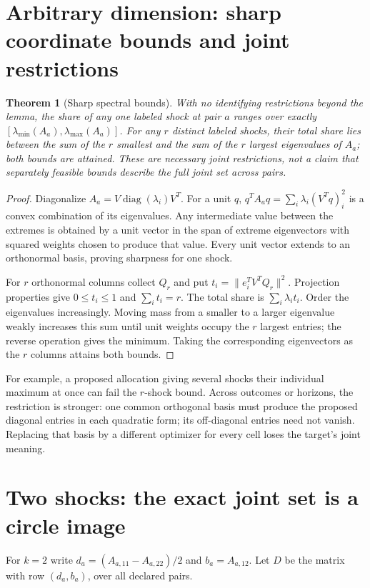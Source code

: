 \documentclass[11pt]{article}
\newtheorem{theorem}{Theorem}
\theoremstyle{remark}
\newcommand{\diag}{\operatorname{diag}}
\begin{document}
\section{Arbitrary dimension: sharp coordinate bounds and joint restrictions}
\begin{theorem}[Sharp spectral bounds]
With no identifying restrictions beyond the lemma, the share of any one
labeled shock at pair $a$ ranges over exactly
$[\lambda_{\min}(A_a),\lambda_{\max}(A_a)]$.
For any $r$ distinct labeled shocks, their total share lies between the
sum of the $r$ smallest and the sum of the $r$ largest eigenvalues of
$A_a$; both bounds are attained. These are necessary joint restrictions,
not a claim that separately feasible bounds describe the full joint set
across pairs.
\end{theorem}
\begin{proof}
Diagonalize $A_a=V\diag(\lambda_i)V^T$. For a unit $q$,
$q^TA_aq=\sum_i\lambda_i(V^Tq)_i^2$ is a convex combination of its
eigenvalues. Any intermediate value between the extremes is obtained by
a unit vector in the span of extreme eigenvectors with squared weights
chosen to produce that value. Every unit vector extends to an orthonormal
basis, proving sharpness for one shock.

For $r$ orthonormal columns collect $Q_r$ and put
$t_i=\|e_i^TV^TQ_r\|^2$. Projection properties give $0\leq t_i\leq1$
and $\sum_i t_i=r$. The total share is $\sum_i\lambda_i t_i$.
Order the eigenvalues increasingly. Moving mass from a smaller to a larger
eigenvalue weakly increases this sum until unit weights occupy the $r$
largest entries; the reverse operation gives the minimum. Taking the
corresponding eigenvectors as the $r$ columns attains both bounds.
\end{proof}
For example, a proposed allocation giving several shocks their individual
maximum at once can fail the $r$-shock bound. Across outcomes or horizons,
the restriction is stronger: one common orthogonal basis must produce the proposed diagonal entries
in each quadratic form; its off-diagonal entries need not vanish. Replacing that basis by a
different optimizer for every cell loses the target's joint meaning.

\section{Two shocks: the exact joint set is a circle image}
For $k=2$ write $d_a=(A_{a,11}-A_{a,22})/2$ and $b_a=A_{a,12}$.
Let $D$ be the matrix with row $(d_a,b_a)$, over all declared pairs.
\end{document}
